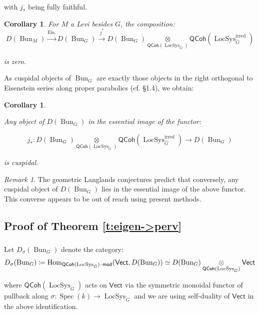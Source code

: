 \documentclass[reqno,11pt]{amsart}
\numberwithin{equation}{subsection}
\newtheorem{cor}[thm]{Corollary}
\theoremstyle{remark}
\newtheorem{rem}[thm]{Remark}
\newcommand{\xar}[1]{\xrightarrow{#1}}
\newcommand{\on}{\operatorname}
\newcommand{\mathendash}{\text{\textendash}}
\newcommand{\Hom}{\on{Hom}}
\newcommand{\Spec}{\on{Spec}}
\newcommand{\Vect}{\mathsf{Vect}}
\newcommand{\Bun}{\on{Bun}}
\newcommand{\LocSys}{\on{LocSys}}
\renewcommand{\mod}{\mathendash\mathsf{mod}}
\newcommand{\QCoh}{\mathsf{QCoh}}
\begin{document}
\noindent with $j_*$ being fully faithful.

\begin{cor}

For $M$ a Levi besides $G$, the composition:
%
\[
D(\Bun_M) \xar{\on{Eis}_!} D(\Bun_G) \xar{j^*} 
D(\Bun_G) 
\underset{\QCoh(\LocSys_{\check{G}})}{\otimes}
\QCoh(\LocSys_{\check{G}}^{\on{irred}})
\]

\noindent is zero.

\end{cor}

As cuspidal objects of $\Bun_G$ are exactly those objects
in the right orthogonal to Eisenstein series along proper parabolics
(cf. \cite{geometric-ct} \S 1.4), we obtain:

\begin{cor}\label{c:irred->cusp}

Any object of $D(\Bun_G)$ in the essential image
of the functor:

\[ 
j_*:D(\Bun_G) 
\underset{\QCoh(\LocSys_{\check{G}})}{\otimes}
\QCoh(\LocSys_{\check{G}}^{\on{irred}})
\to D(\Bun_G)
\]
 
\noindent is cuspidal.

\end{cor}

\begin{rem}

The geometric Langlands conjectures predict that conversely,
any cuspidal object of $D(\Bun_G)$ lies in the essential image
of the above functor. This converse appears to be out of reach using 
present methods. 

\end{rem}

\subsection{Proof of Theorem \ref{t:eigen->perv}}\label{ss:perv-pf}

\subsubsection{}\label{sss:eigensheaf-defin}

Let $D_{\sigma}(\Bun_G)$ denote the category:
%
\[
D_{\sigma}(\Bun_G) \coloneqq 
\Hom_{\QCoh(\LocSys_{\check{G}})\mod}(\Vect,D(\Bun_G)) \simeq  
D(\Bun_G) \underset{\QCoh(\LocSys_{\check{G}})}{\otimes} 
\Vect
\]

\noindent where $\QCoh(\LocSys_{\check{G}})$ acts on $\Vect$ 
via the symmetric monoidal functor of pullback along
$\sigma:\Spec(k) \to \LocSys_{\check{G}}$ and we are using
self-duality of $\Vect$ in the above identification. 
\end{document}
